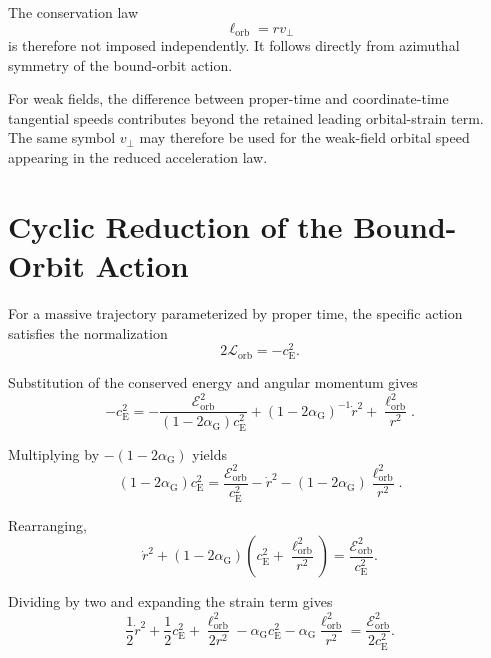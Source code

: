 The conservation law
\begin{equation}
    \ell_{\mathrm{orb}} = r v_\perp
\end{equation}
is therefore not imposed independently. It follows directly from azimuthal symmetry of the bound-orbit action.

For weak fields, the difference between proper-time and coordinate-time tangential speeds contributes beyond the retained leading orbital-strain term. The same symbol $v_\perp$ may therefore be used for the weak-field orbital speed appearing in the reduced acceleration law.

\section{Cyclic Reduction of the Bound-Orbit Action}

For a massive trajectory parameterized by proper time, the specific action satisfies the normalization
\begin{equation}
    2\mathcal{L}_{\mathrm{orb}} = -c_{\mathrm{E}}^2.
\end{equation}

Substitution of the conserved energy and angular momentum gives
\begin{equation}
    -c_{\mathrm{E}}^2 = - \frac{ \mathcal{E}_{\mathrm{orb}}^2 }{ \left( 1-2\alpha_{\mathrm{G}} \right) c_{\mathrm{E}}^2 } + \left( 1-2\alpha_{\mathrm{G}} \right)^{-1} \dot{r}^2 + \frac{\ell_{\mathrm{orb}}^2}{r^2}.
\end{equation}

Multiplying by $-\left( 1-2\alpha_{\mathrm{G}} \right)$ yields
\begin{equation}
    \left( 1-2\alpha_{\mathrm{G}} \right) c_{\mathrm{E}}^2 = \frac{\mathcal{E}_{\mathrm{orb}}^2}{c_{\mathrm{E}}^2} - \dot{r}^2 - \left( 1-2\alpha_{\mathrm{G}} \right) \frac{\ell_{\mathrm{orb}}^2}{r^2}.
\end{equation}

Rearranging,
\begin{equation}
    \dot{r}^2 + \left( 1-2\alpha_{\mathrm{G}} \right) \left( c_{\mathrm{E}}^2 + \frac{\ell_{\mathrm{orb}}^2}{r^2} \right) = \frac{\mathcal{E}_{\mathrm{orb}}^2}{c_{\mathrm{E}}^2}.
\end{equation}

Dividing by two and expanding the strain term gives
\begin{equation}
    \frac{1}{2}\dot{r}^2 + \frac{1}{2}c_{\mathrm{E}}^2 + \frac{\ell_{\mathrm{orb}}^2}{2r^2} - \alpha_{\mathrm{G}}c_{\mathrm{E}}^2 - \alpha_{\mathrm{G}} \frac{\ell_{\mathrm{orb}}^2}{r^2} = \frac{\mathcal{E}_{\mathrm{orb}}^2}{2c_{\mathrm{E}}^2}.
\end{equation}

